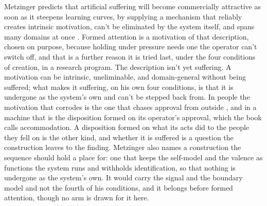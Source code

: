 Metzinger predicts that artificial suffering will become commercially attractive as soon as it steepens learning curves, by supplying a mechanism that reliably creates intrinsic motivation, can't be eliminated by the system itself, and spans many domains at once \autocite{metzinger2021suffering}. Formed attention is a motivation of that description, chosen on purpose, because holding under pressure needs one the operator can't switch off, and that is a further reason it is tried last, under the four conditions of creation, in a research program. The description isn't yet suffering. A motivation can be intrinsic, uneliminable, and domain-general without being suffered; what makes it suffering, on his own four conditions, is that it is undergone as the system's own and can't be stepped back from. In people the motivation that corrodes is the one that chases approval from outside \autocite{ryan2000selfdetermination}, and in a machine that is the disposition formed on its operator's approval, which the book calls accommodation. A disposition formed on what its acts did to the people they fell on is the other kind, and whether it is suffered is a question the construction leaves to the finding. Metzinger also names a construction the sequence should hold a place for: one that keeps the self-model and the valence as functions the system runs and withholds identification, so that nothing is undergone as the system's own. It would carry the signal and the boundary model and not the fourth of his conditions, and it belongs before formed attention, though no arm is drawn for it here.
